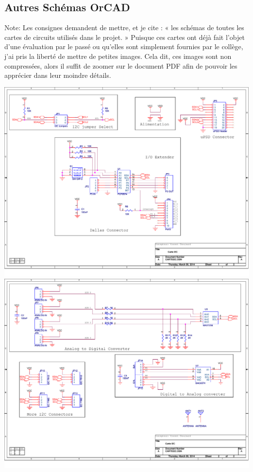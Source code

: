 \subsection{Autres Schémas OrCAD}
Note: Les consignes demandent de mettre, et je cite : « les schémas de toutes les cartes de circuits utilisés dans le projet. » Puisque ces cartes ont déjà fait l'objet d'une évaluation par le passé ou qu'elles sont simplement fournies par le collège, j'ai pris la liberté de mettre de petites images. Cela dit, ces images sont non compressées, alors il suffit de zoomer sur le document PDF afin de pouvoir les apprécier dans leur moindre détails.

\begin{multicols}{4}

\includegraphics[scale=0.2,angle=90]{Figures/OrCad/ExtensionI2C1.pdf}
\includegraphics[scale=0.2,angle=90]{Figures/OrCad/ExtensionI2C2.pdf}

\end{multicols}
